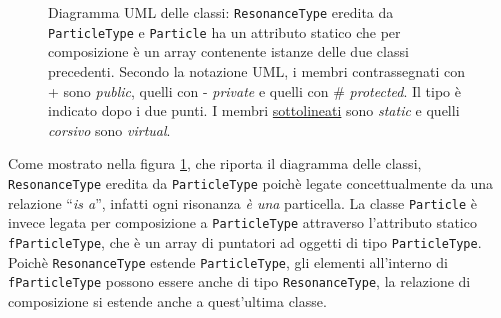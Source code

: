 \documentclass{article}
\begin{document}
\begin{figure}[h!]
\caption{Diagramma UML delle classi: \texttt{ResonanceType} eredita da \texttt{ParticleType} e \texttt{Particle} ha un attributo statico che per composizione è un array contenente istanze delle due classi precedenti. Secondo la notazione UML, i membri contrassegnati con + sono \textit{public}, quelli con - \textit{private} e quelli con \# \textit{protected}. Il tipo è indicato dopo i due punti. I membri \underline{sottolineati} sono \textit{static} e quelli \textit{corsivo} sono \textit{virtual}.}
\label{fig:uml}
\end{figure}

Come mostrato nella figura \ref{fig:uml}, che riporta il diagramma delle classi, \texttt{ResonanceType} eredita da \texttt{ParticleType} poichè legate concettualmente da una relazione ``\textit{is a}'', infatti ogni risonanza \textit{è una} particella. La classe \texttt{Particle} è invece legata per composizione a \texttt{ParticleType} attraverso l'attributo statico \texttt{fParticleType}, che è un array di puntatori ad oggetti di tipo \texttt{ParticleType}. Poichè \texttt{ResonanceType} estende \texttt{ParticleType}, gli elementi all'interno di \texttt{fParticleType} possono essere anche di tipo \texttt{ResonanceType}, la relazione di composizione si estende anche a quest'ultima classe.
\end{document}
